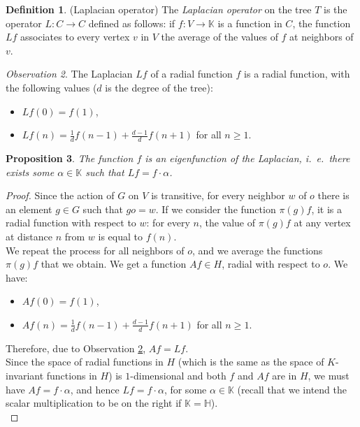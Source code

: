 \documentclass{article}
\theoremstyle{definition}
\newtheorem{dfn}{Definition}[section]
\theoremstyle{remark}
\newtheorem{obs}[dfn]{Observation}
\theoremstyle{plain}
\newtheorem{prp}[dfn]{Proposition}
\begin{document}
\begin{dfn}{(Laplacian operator)} \label{lapl}
The \textit{Laplacian operator} on the tree $T$ is the operator $L: C\rightarrow C$ defined as follows: if $f: V\rightarrow\mathbb{K}$ is a function in $C$, the function $Lf$ associates to every vertex $v$ in $V$ the average of the values of $f$ at neighbors of $v$. \\
\end{dfn}

\begin{obs} \label{calclapl}
The Laplacian $Lf$ of a radial function $f$ is a radial function, with the following values ($d$ is the degree of the tree):
\begin{itemize}
    \item $Lf(0)=f(1)$,
    \item $Lf(n)=\frac{1}{d}f(n-1)+\frac{d-1}{d}f(n+1)$ for all $n\geq 1$. \\
\end{itemize}
\end{obs}

\begin{prp}
The function $f$ is an eigenfunction of the Laplacian, i.~e.~there exists some $\alpha\in\mathbb{K}$ such that $Lf=f\cdot\alpha$.
\end{prp}

\begin{proof}
Since the action of $G$ on $V$ is transitive, for every neighbor $w$ of $o$ there is an element $g\in G$ such that $go=w$. If we consider the function $\pi(g)f$, it is a radial function with respect to $w$: for every $n$, the value of $\pi(g)f$ at any vertex at distance $n$ from $w$ is equal to $f(n)$. \\

We repeat the process for all neighbors of $o$, and we average the functions $\pi(g)f$ that we obtain. We get a function $Af\in H$, radial with respect to $o$. We have:
\begin{itemize}
    \item $Af(0)=f(1)$,
    \item $Af(n)=\frac{1}{d}f(n-1)+\frac{d-1}{d}f(n+1)$ for all $n\geq 1$.
\end{itemize}
Therefore, due to Observation \ref{calclapl}, $Af=Lf$. \\

Since the space of radial functions in $H$ (which is the same as the space of $K$-invariant functions in $H$) is $1$-dimensional and both $f$ and $Af$ are in $H$, we must have $Af=f\cdot\alpha$, and hence $Lf=f\cdot\alpha$, for some $\alpha\in\mathbb{K}$ (recall that we intend the scalar multiplication to be on the right if $\mathbb{K}=\mathbb{H}$). \\
\end{proof}
\end{document}

